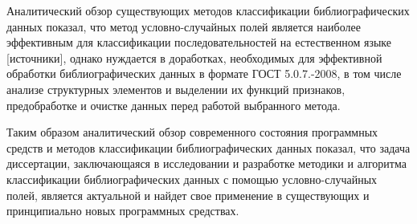 Аналитический обзор существующих методов классификации библиографических данных показал, что метод условно-случайных полей является наиболее эффективным для классификации последовательностей на естественном языке [источники], однако нуждается в доработках, необходимых для эффективной обработки библиографических данных в формате ГОСТ 5.0.7.-2008, в том числе анализе структурных элементов и выделении их функций признаков, предобработке и очистке данных перед работой выбранного метода.

Таким образом аналитический обзор современного состояния программных средств и методов классификации библиографических данных показал, что задача диссертации, заключающаяся в исследовании и разработке методики и алгоритма классификации библиографических данных с помощью условно-случайных полей, является актуальной и найдет свое применение в существующих и принципиально новых программных средствах.
